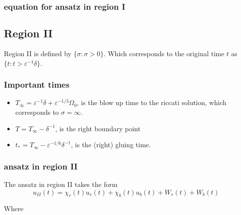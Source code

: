 \documentclass[letterpaper,11pt]{article}
\newcommand{\eps}{\varepsilon}
\numberwithin{equation}{section}
\theoremstyle{plain}
\begin{document}
\subsubsection{equation for ansatz in region I}

\subsection{Region II}

Region II is defined by $\{ \sigma : \sigma > 0 \}$. Which corresponds to the original time $t$ as $\{ t : t > \eps^{-1}\delta\}$.
\subsubsection{Important times}
\begin{itemize}
\item $T_\infty= \eps^{-1}\delta + \eps^{-1/3}\Omega_0$, is the blow up time to the riccati solution, which corresponds to $\sigma = \infty$.

\item $T = T_\infty - \delta^{-1}$, is the right boundary point

\item $t_*  = T_\infty - \eps^{-1/6}\delta^{-1}$, is the (right) gluing time.
\end{itemize}
\subsubsection{ansatz in region II}
The ansatz in region II takes the form
\[
u_{II}(t) = \chi_r(t)u_r(t) + \chi_b(t)u_b(t) + W_r(t)+W_b(t)
\]

Where 
\end{document}
